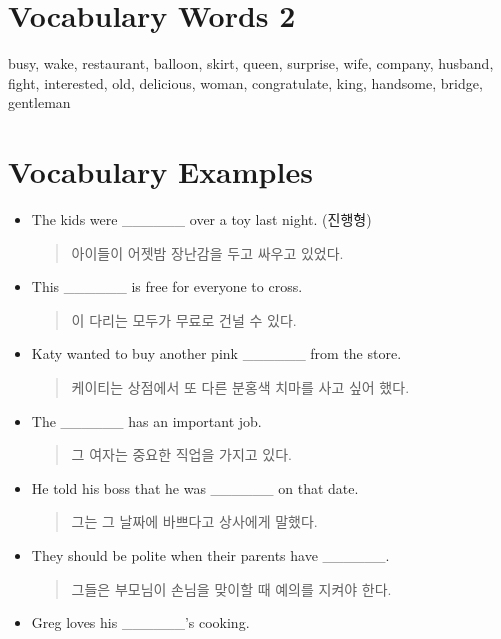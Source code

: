 \documentclass{article}
\begin{document}
\renewcommand{\familydefault}{\sfdefault}
\onehalfspacing
\fontsize{12pt}{14pt}\selectfont

\section*{Vocabulary Words 2}
\begin{addmargin}[1em]{1em}
busy, wake, restaurant, balloon, skirt, queen, surprise, wife, company, husband, fight, interested, old, delicious, woman, congratulate, king, handsome, bridge, gentleman
\end{addmargin}

\section*{Vocabulary Examples}
\begin{addmargin}[1em]{1em}
\begin{itemize}
    \item The kids were \_\_\_\_\_\_ over a toy last night. (진행형)
    \begin{quote}
    아이들이 어젯밤 장난감을 두고 싸우고 있었다.
    \end{quote}
    \item This \_\_\_\_\_\_ is free for everyone to cross.
    \begin{quote}
    이 다리는 모두가 무료로 건널 수 있다.
    \end{quote}
    \item Katy wanted to buy another pink \_\_\_\_\_\_ from the store.
    \begin{quote}
    케이티는 상점에서 또 다른 분홍색 치마를 사고 싶어 했다.
    \end{quote}
    \item The \_\_\_\_\_\_ has an important job.
    \begin{quote}
    그 여자는 중요한 직업을 가지고 있다.
    \end{quote}
    \item He told his boss that he was \_\_\_\_\_\_ on that date.
    \begin{quote}
    그는 그 날짜에 바쁘다고 상사에게 말했다.
    \end{quote}
    \item They should be polite when their parents have \_\_\_\_\_\_.
    \begin{quote}
    그들은 부모님이 손님을 맞이할 때 예의를 지켜야 한다.
    \end{quote}
    \item Greg loves his \_\_\_\_\_\_'s cooking.

\end{itemize}
\end{addmargin}
\end{document}
